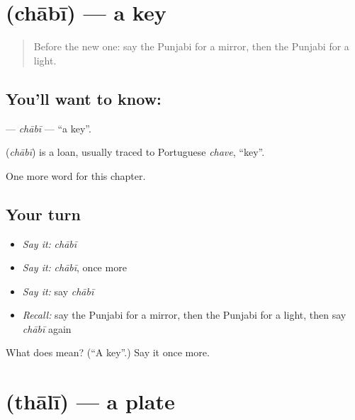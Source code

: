 \section[\texorpdfstring{\pa{ਚਾਬੀ} (chābī)}{ਚਾਬੀ (chābī)}]{ (chābī) — a key}

\label{lesson:PA-C69-chabi}



\begin{quote}
Before the new one: say the Punjabi for a mirror, then the Punjabi for a light.
\end{quote}

\subsection*{You'll want to know: }
\textbf{} — \emph{chābī} — \textquotedblleft{}a key\textquotedblright{}.

\begin{cousinweb}
\textbf{} (\emph{chābī}) is a loan, usually traced to Portuguese \emph{chave}, \textquotedblleft{}key\textquotedblright{}.
\end{cousinweb}

\begin{grammarlens}[title={What you've built}]
One more word for this chapter.
\end{grammarlens}

\subsection*{Your turn}
\begin{itemize}
\raggedright
  \item \emph{Say it:} \emph{chābī}
  \item \emph{Say it:} \emph{chābī}, once more
  \item \emph{Say it:} say \emph{chābī}
  \item \emph{Recall:} say the Punjabi for a mirror, then the Punjabi for a light, then say \emph{chābī} again
\end{itemize}

\begin{tcolorbox}[breakable,colback=teal!4,colframe=teal!35!black,title={Before you move on}]
What does  mean? (\textquotedblleft{}A key\textquotedblright{}.) Say it once more.
\end{tcolorbox}
\section[\texorpdfstring{\pa{ਥਾਲੀ} (thālī)}{ਥਾਲੀ (thālī)}]{ (thālī) — a plate}

